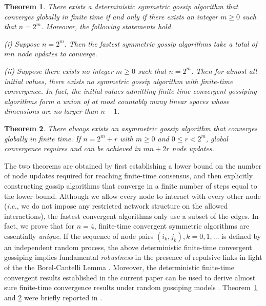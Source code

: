 \documentclass[a4paper, 11pt]{article}
\newtheorem{theorem}{Theorem}
\begin{document}
\begin{theorem}\label{thmsym}
There exists a deterministic  symmetric gossip algorithm  that converges globally in finite time  if and only if there exists an integer $m\geq 0$ such that $n=2^m$. Moreover, the following statements hold.

(i) Suppose $n=2^m$. Then the fastest symmetric gossip algorithms take a total of $mn$ node updates to converge.

(ii) Suppose there exists no  integer $m\geq 0$ such that $n=2^m$. Then for almost all initial values, there exists no symmetric gossip algorithm with finite-time convergence. In fact, the initial values admitting finite-time convergent gossiping algorithms form a union of at most countably many linear spaces whose dimensions are no larger than $n-1$.
\end{theorem}


\medskip


\begin{theorem}\label{thasym}
There always exists an asymmetric gossip algorithm that converges globally in finite time. If  $n=2^m+r$ with $m\geq 0$ and  $0\leq r<2^m$, global convergence requires and can be achieved in $mn+2r$ node updates.
\end{theorem}


\medskip

The two theorems are obtained by first establishing a lower bound on the number of node updates required for reaching finite-time consensus, and then explicitly constructing gossip algorithms that converge in a finite number of steps equal to the lower bound. Although we allow every node to interact with every other node (\emph{i.e.}, we do not impose any restricted network structure on the allowed interactions), the  fastest convergent algorithms only use a subset of the edges. In fact, we  prove that for $n=4$, finite-time convergent symmetric algorithms are essentially {\it unique}. If the sequence of node pairs $(i_{k}, j_{k}),k=0,1,\dots$ is defined by an independent random process, the above deterministic finite-time convergent gossiping implies fundamental {\it robustness}  in the presence of repulsive links in light of the the Borel-Cantelli Lemma \cite{Shi2013}. Moreover, the deterministic finite-time convergent results established in the current paper can be used to derive almost sure finite-time convergence results under random gossiping models \cite{Shi-TIT}. Theorem~\ref{thmsym} and \ref{thasym} were briefly  reported in \cite{MTNS}.
\end{document}
